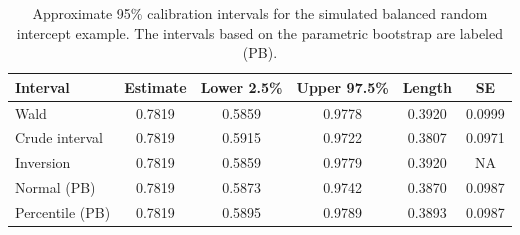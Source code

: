 \documentclass[cmfont,usenames,dvipsnames,leqno]{afit-etd}\usepackage[]{graphicx}\usepackage[]{color}
\begin{document}
\begin{table}[!htb]
\centering
\caption[ 95\% calibration intervals for simulated balanced random intercept data]{Approximate 95\% calibration intervals for the simulated balanced random intercept example. The intervals based on the parametric bootstrap are labeled (PB). \label{tab:simdata-intervals}}
\begin{tabular}{lccccc}
    \toprule
    Interval        & Estimate & Lower 2.5\% & Upper 97.5\% & Length & SE \\
    \midrule
    Wald            & 0.7819 & 0.5859 & 0.9778 & 0.3920 & 0.0999 \\
    Crude interval  & 0.7819 & 0.5915 & 0.9722 & 0.3807 & 0.0971 \\
    Inversion       & 0.7819 & 0.5859 & 0.9779 & 0.3920 & NA     \\
    Normal (PB)     & 0.7819 & 0.5873 & 0.9742 & 0.3870 & 0.0987 \\
    Percentile (PB) & 0.7819 & 0.5895 & 0.9789 & 0.3893 & 0.0987 \\
    \bottomrule
\end{tabular}
\end{table}

\end{document}
